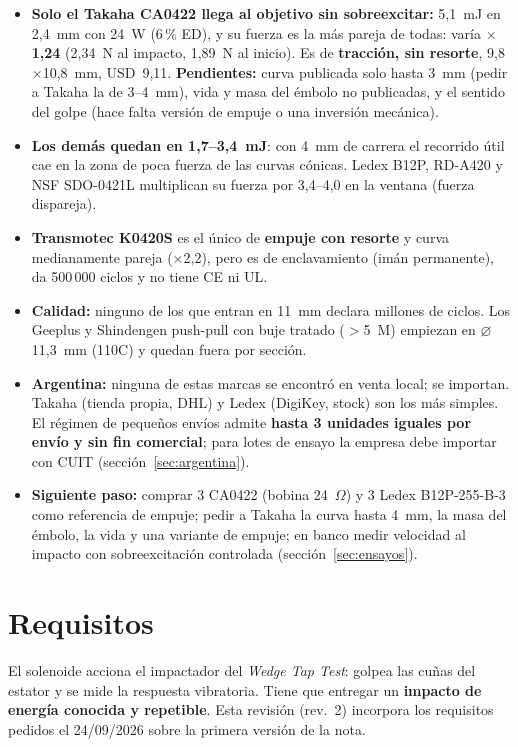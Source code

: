 \documentclass[11pt,a4paper]{article}
\begin{document}
\begin{itemize}
  \item \textbf{Solo el Takaha CA0422 llega al objetivo sin sobreexcitar:} 5,1~mJ en 2,4~mm con 24~W (6\,\% ED), y
        su fuerza es la más pareja de todas: varía \textbf{$\times$1,24} (2,34~N al impacto, 1,89~N al inicio). Es de
        \textbf{tracción, sin resorte}, 9,8$\times$10,8~mm, USD~9,11. \textbf{Pendientes:} curva publicada solo
        hasta 3~mm (pedir a Takaha la de 3--4~mm), vida y masa del émbolo no publicadas, y el sentido del golpe
        (hace falta versión de empuje o una inversión mecánica).
  \item \textbf{Los demás quedan en 1,7--3,4~mJ}: con 4~mm de carrera el recorrido útil cae en la zona de poca
        fuerza de las curvas cónicas. Ledex B12P, RD-A420 y NSF SDO-0421L multiplican su fuerza por 3,4--4,0 en
        la ventana (fuerza dispareja).
  \item \textbf{Transmotec K0420S} es el único de \textbf{empuje con resorte} y curva medianamente pareja ($\times$2,2),
        pero es de enclavamiento (imán permanente), da 500\,000 ciclos y no tiene CE ni UL.
  \item \textbf{Calidad:} ninguno de los que entran en 11~mm declara millones de ciclos. Los Geeplus y Shindengen
        push-pull con buje tratado ($>$5~M) empiezan en $\varnothing$11,3~mm (110C) y quedan fuera por sección.
  \item \textbf{Argentina:} ninguna de estas marcas se encontró en venta local; se importan. Takaha (tienda propia,
        DHL) y Ledex (DigiKey, stock) son los más simples. El régimen de pequeños envíos admite \textbf{hasta 3
        unidades iguales por envío y sin fin comercial}; para lotes de ensayo la empresa debe importar con CUIT
        (sección~\ref{sec:argentina}).
  \item \textbf{Siguiente paso:} comprar 3 CA0422 (bobina 24~$\Omega$) y 3 Ledex B12P-255-B-3 como referencia de
        empuje; pedir a Takaha la curva hasta 4~mm, la masa del émbolo, la vida y una variante de empuje; en banco
        medir velocidad al impacto con sobreexcitación controlada (sección~\ref{sec:ensayos}).
\end{itemize}

\section{Requisitos}
El solenoide acciona el impactador del \emph{Wedge Tap Test}: golpea las cuñas del estator y se mide la
respuesta vibratoria. Tiene que entregar un \textbf{impacto de energía conocida y repetible}. Esta revisión
(rev.~2) incorpora los requisitos pedidos el 24/09/2026 sobre la primera versión de la nota.
\end{document}
